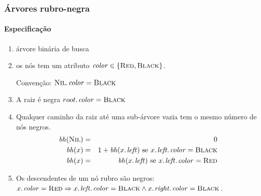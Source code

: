 \documentclass{beamer}
\begin{document}
\begin{frame}

\frametitle{Árvores rubro-negra}
\framesubtitle{Especificação}

\begin{enumerate}

\item árvore binária de busca

\item os nós tem um atributo $\id{color} \in \{ \const{Red}, \const{Black} \}$.

Convenção: $\attrib{\const{Nil}}{color} = \const{Black}$

\item A raiz é negra $\attrib{root}{color} = \const{Black}$

\item Qualquer caminho da raiz até uma sub-árvore vazia tem o mesmo número de
  nós negros.
  \begin{eqnarray*}
    \id{bh}(\const{Nil}) & = & 0 \\
    \id{bh}(x) & = & 1 + \id{bh}(\attrib{x}{left}) \text{ se } \attrib{\attrib{x}{left}}{color} = \const{Black} \\
    \id{bh}(x) & = & \id{bh}(\attrib{x}{left}) \text{ se } \attrib{\attrib{x}{left}}{color} = \const{Red}
  \end{eqnarray*}

\item Os descendentes de um nó rubro são negros: 
$\attrib{x}{color} = \const{Red} \Rightarrow \attrib{\attrib{x}{left}}{color} = \const{Black} \land \attrib{\attrib{x}{right}}{color} = \const{Black}$.

\end{enumerate}

\end{frame}
\end{document}

